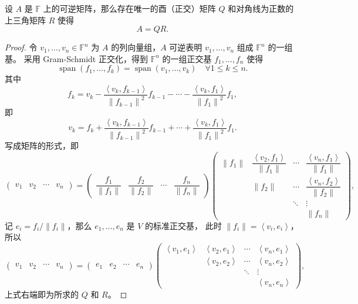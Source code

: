 \documentclass[fontset=none,zihao=-4]{Notes}
\newcommand{\inn}[1]{\left\langle#1\right\rangle}
\newcommand{\norm}[1]{\left\lVert#1\right\rVert}
\newcommand{\spa}[1]{\operatorname{span}\left(#1\right)}
\begin{document}
\begin{theorem}[QR 分解]
  设 $A$ 是 $\mathbb{F}$ 上的可逆矩阵，那么存在唯一的酉（正交）矩阵
  $Q$ 和对角线为正数的上三角矩阵 $R$ 使得
  \[
    A=QR.  
  \]
\end{theorem}
\begin{proof}
  令 $v_1,\dots,v_n\in\mathbb{F}^n$ 为 $A$ 的列向量组，$A$ 可逆表明
  $v_1,\dots,v_n$ 组成 $\mathbb{F}^n$ 的一组基。
  采用 Gram-Schmidt 正交化，得到 $\mathbb{F}^n$ 的一组正交基 $f_1,\dots,f_n$
  使得
  \[
    \spa{f_1,\dots,f_k}=\spa{v_1,\dots,v_k}\quad \forall 1\leq k\leq n.  
  \]
  其中
  \[
    f_k=v_k-\frac{\inn{v_k,f_{k-1}}}{\norm{f_{k-1}}^2}f_{k-1}-\cdots-\frac{\inn{v_k,f_1}}{\norm{f_1}^2}f_1  ,
  \]
  即
  \[
    v_k=f_k+  \frac{\inn{v_k,f_{k-1}}}{\norm{f_{k-1}}^2}f_{k-1}+\cdots+\frac{\inn{v_k,f_1}}{\norm{f_1}^2}f_1  .
  \]
  写成矩阵的形式，即
  \[
    \begin{pmatrix}
      v_1 & v_2 & \cdots & v_n 
    \end{pmatrix}=
    \begin{pmatrix}
      \dfrac{f_1}{\norm{f_1}} & \dfrac{f_2}{\norm{f_2}} & \cdots & \dfrac{f_n}{\norm{f_n}}
    \end{pmatrix}
    \begin{pmatrix}
      \norm{f_1} & \dfrac{\inn{v_2,f_1}}{\norm{f_1}} & \cdots & 
      \dfrac{\inn{v_n,f_1}}{\norm{f_1}} \\[15pt]
      & \norm{f_2} & \cdots & \dfrac{\inn{v_n,f_2}}{\norm{f_2}} \\[5pt]
      & & \ddots & \vdots \\
      & & & \norm{f_n}
    \end{pmatrix}  ,
  \]
  记 $e_i=f_i/\norm{f_i}$，那么 $e_1,\dots,e_n$ 是 $V$ 的标准正交基，
  此时 $\norm{f_i}=\inn{v_i,e_i}$，所以
  \[
    \begin{pmatrix}
      v_1 & v_2 & \cdots & v_n 
    \end{pmatrix}=
    \begin{pmatrix}
      e_1 & e_2 & \cdots & e_n
    \end{pmatrix}
    \begin{pmatrix}
      \inn{v_1,e_1} & \inn{v_2,e_1} & \cdots & \inn{v_n,e_1} \\
      & \inn{v_2,e_2} & \cdots & \inn{v_n,e_2} \\
      & & \ddots & \vdots \\
      & & & \inn{v_n,e_n}
    \end{pmatrix}  ,
  \]
  上式右端即为所求的 $Q$ 和 $R$。


\end{proof}
\end{document}
